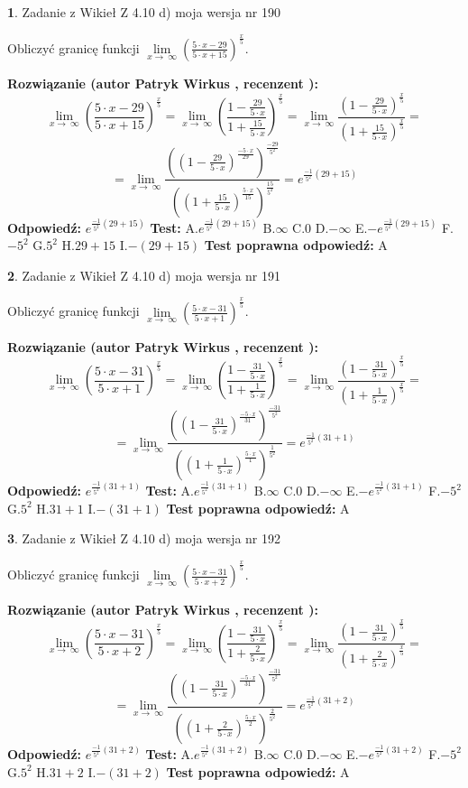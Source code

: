 \documentclass[12pt, a4paper]{article}
\theoremstyle{definition} %
\newtheorem{zad}{}
\newcommand{\zadStart}[1]{\begin{zad}#1\newline}
\newcommand{\zadStop}{\end{zad}}
\newcommand{\rozwStart}[2]{\noindent \textbf{Rozwiązanie (autor #1 , recenzent #2): }\newline}
\newcommand{\rozwStop}{\newline}
\newcommand{\odpStart}{\noindent \textbf{Odpowiedź:}\newline}
\newcommand{\odpStop}{\newline}
\newcommand{\testStart}{\noindent \textbf{Test:}\newline}
\newcommand{\testStop}{\newline}
\newcommand{\kluczStart}{\noindent \textbf{Test poprawna odpowiedź:}\newline}
\newcommand{\kluczStop}{\newline}
\begin{document}
\zadStart{Zadanie z Wikieł Z 4.10 d) moja wersja nr 190}


Obliczyć granicę funkcji  $\lim\limits_{x\to\ \infty}(\frac{5\cdot x-29}{5\cdot x+15})^{\frac{x}{5}}$.
\zadStop
\rozwStart{Patryk Wirkus}{}
$$\lim\limits_{x\to\ \infty}(\frac{5\cdot x-29}{5\cdot x+15})^{\frac{x}{5}} = \lim\limits_{x\to\ \infty}(\frac{1-\frac{29}{5\cdot x}}{1+\frac{15}{5\cdot x}})^{\frac{x}{5}}=\lim\limits_{x\to\ \infty}\frac{(1-\frac{29}{5\cdot x})^{\frac{x}{5}}}{(1+\frac{15}{5\cdot x})^{\frac{x}{5}}}=$$
$$=\lim\limits_{x\to\ \infty}\frac{((1-\frac{29}{5\cdot x})^{\frac{-5\cdot x}{29}})^{\frac{-29}{5^{2}}}}{((1+\frac{15}{5\cdot x})^{\frac{5\cdot x}{15}})^{\frac{15}{5^{2}}}}=e^{\frac{-1}{5^{2}}(29+15)}$$
\rozwStop
\odpStart
$e^{\frac{-1}{5^{2}}(29+15)}$
\odpStop
\testStart
A.$e^{\frac{-1}{5^{2}}(29+15)}$ B.$\infty$ C.$0$ D.$-\infty$ E.$-e^{\frac{-1}{5^{2}}(29+15)}$
F.$-5^{2}$ G.$5^{2}$
H.$29+15$
I.$-(29+15)$
\testStop
\kluczStart
A
\kluczStop



\zadStart{Zadanie z Wikieł Z 4.10 d) moja wersja nr 191}


Obliczyć granicę funkcji  $\lim\limits_{x\to\ \infty}(\frac{5\cdot x-31}{5\cdot x+1})^{\frac{x}{5}}$.
\zadStop
\rozwStart{Patryk Wirkus}{}
$$\lim\limits_{x\to\ \infty}(\frac{5\cdot x-31}{5\cdot x+1})^{\frac{x}{5}} = \lim\limits_{x\to\ \infty}(\frac{1-\frac{31}{5\cdot x}}{1+\frac{1}{5\cdot x}})^{\frac{x}{5}}=\lim\limits_{x\to\ \infty}\frac{(1-\frac{31}{5\cdot x})^{\frac{x}{5}}}{(1+\frac{1}{5\cdot x})^{\frac{x}{5}}}=$$
$$=\lim\limits_{x\to\ \infty}\frac{((1-\frac{31}{5\cdot x})^{\frac{-5\cdot x}{31}})^{\frac{-31}{5^{2}}}}{((1+\frac{1}{5\cdot x})^{\frac{5\cdot x}{1}})^{\frac{1}{5^{2}}}}=e^{\frac{-1}{5^{2}}(31+1)}$$
\rozwStop
\odpStart
$e^{\frac{-1}{5^{2}}(31+1)}$
\odpStop
\testStart
A.$e^{\frac{-1}{5^{2}}(31+1)}$ B.$\infty$ C.$0$ D.$-\infty$ E.$-e^{\frac{-1}{5^{2}}(31+1)}$
F.$-5^{2}$ G.$5^{2}$
H.$31+1$
I.$-(31+1)$
\testStop
\kluczStart
A
\kluczStop



\zadStart{Zadanie z Wikieł Z 4.10 d) moja wersja nr 192}


Obliczyć granicę funkcji  $\lim\limits_{x\to\ \infty}(\frac{5\cdot x-31}{5\cdot x+2})^{\frac{x}{5}}$.
\zadStop
\rozwStart{Patryk Wirkus}{}
$$\lim\limits_{x\to\ \infty}(\frac{5\cdot x-31}{5\cdot x+2})^{\frac{x}{5}} = \lim\limits_{x\to\ \infty}(\frac{1-\frac{31}{5\cdot x}}{1+\frac{2}{5\cdot x}})^{\frac{x}{5}}=\lim\limits_{x\to\ \infty}\frac{(1-\frac{31}{5\cdot x})^{\frac{x}{5}}}{(1+\frac{2}{5\cdot x})^{\frac{x}{5}}}=$$
$$=\lim\limits_{x\to\ \infty}\frac{((1-\frac{31}{5\cdot x})^{\frac{-5\cdot x}{31}})^{\frac{-31}{5^{2}}}}{((1+\frac{2}{5\cdot x})^{\frac{5\cdot x}{2}})^{\frac{2}{5^{2}}}}=e^{\frac{-1}{5^{2}}(31+2)}$$
\rozwStop
\odpStart
$e^{\frac{-1}{5^{2}}(31+2)}$
\odpStop
\testStart
A.$e^{\frac{-1}{5^{2}}(31+2)}$ B.$\infty$ C.$0$ D.$-\infty$ E.$-e^{\frac{-1}{5^{2}}(31+2)}$
F.$-5^{2}$ G.$5^{2}$
H.$31+2$
I.$-(31+2)$
\testStop
\kluczStart
A
\kluczStop
\end{document}
